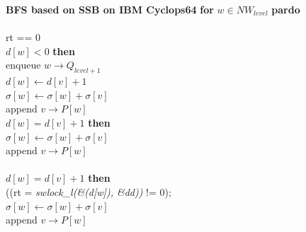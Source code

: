 \begin{flushleft}
\begin{algorithm}\label{algo:ssb}
	{\bf  BFS based on SSB on IBM Cyclops64}
	{\bf for} $w \in NW_{level}$ {\bf pardo}\\
	\hspace*{1pc}{\it rt = swlock\_l(\&(d[w]), \&dd);}\\
	\hspace*{1pc}{\bf if} rt == 0\\
	\hspace*{2pc}{\bf if} $d[w]<0$ {\bf then}\\
	\hspace*{3pc}enqueue $w\rightarrow Q_{level+1}$\\
	\hspace*{3pc}$d[w]\leftarrow d[v]+1$\\
	\hspace*{3pc}$\sigma[w]\leftarrow \sigma[w]+\sigma[v]$\\
	\hspace*{3pc}append $v\rightarrow P[w]$\\
	\hspace*{2pc}{\bf else if} $d[w]=d[v]+1$ {\bf then}\\
	\hspace*{3pc}$\sigma[w]\leftarrow \sigma[w]+\sigma[v]$\\
	\hspace*{3pc}append $v\rightarrow P[w]$\\
	\hspace*{2pc}{\it sunlock(\&(d[w]));}\\
	\hspace*{1pc}{\bf else if} $d[w]=d[v]+1$ {\bf then}\\
	\hspace*{2pc}{\bf while} ((rt = {\it swlock\_l(\&(d[w]), \&dd))} != 0);\\
	\hspace*{2pc}$\sigma[w]\leftarrow \sigma[w]+\sigma[v]$\\
	\hspace*{2pc}append $v\rightarrow P[w]$\\
	\hspace*{2pc}{\it sunlock(\&(d[w]));}
\end{algorithm}


\end{flushleft}

